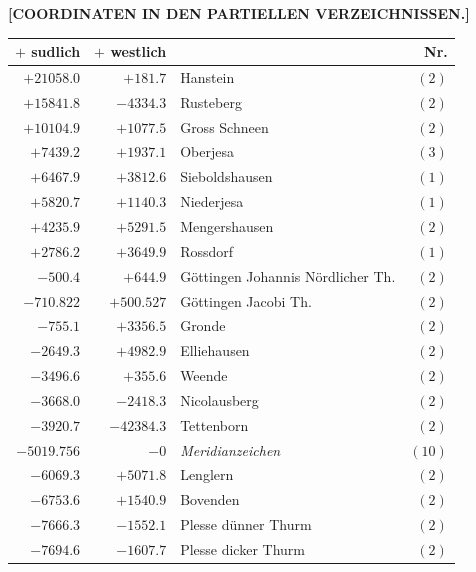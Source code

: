 \clearpage
{}
\begin{center}\textbf{[COORDINATEN IN DEN PARTIELLEN VERZEICHNISSEN.]}\end{center}
\begin{center}\begingroup\fontsize{8}{9}\selectfont
\setlength{\tabcolsep}{4pt}
\begin{tabular}{r|r|p{170pt}|r}\hline
\(+\) sudlich&\(+\) westlich&&Nr.\\\hline
\(+21058.0\)&\(+181.7\)&Hanstein&\((2)\)\\
\(+15841.8\)&\(-4334.3\)&Rusteberg&\((2)\)\\
\(+10104.9\)&\(+1077.5\)&Gross Schneen&\((2)\)\\
\(+7439.2\)&\(+1937.1\)&Oberjesa&\((3)\)\\
\(+6467.9\)&\(+3812.6\)&Sieboldshausen&\((1)\)\\
\(+5820.7\)&\(+1140.3\)&Niederjesa&\((1)\)\\
\(+4235.9\)&\(+5291.5\)&Mengershausen&\((2)\)\\
\(+2786.2\)&\(+3649.9\)&Rossdorf&\((1)\)\\
\(-500.4\)&\(+644.9\)&Göttingen Johannis Nördlicher Th.&\((2)\)\\
\(-710.822\)&\(+500.527\)&Göttingen Jacobi Th.&\((2)\)\\
\(-755.1\)&\(+3356.5\)&Gronde&\((2)\)\\
\(-2649.3\)&\(+4982.9\)&Elliehausen&\((2)\)\\
\(-3496.6\)&\(+355.6\)&Weende&\((2)\)\\
\(-3668.0\)&\(-2418.3\)&Nicolausberg&\((2)\)\\
\(-3920.7\)&\(-42384.3\)&Tettenborn&\((2)\)\\
\(-5019.756\)&\(-0\)&\textit{Meridianzeichen}&\((10)\)\\
\(-6069.3\)&\(+5071.8\)&Lenglern&\((2)\)\\
\(-6753.6\)&\(+1540.9\)&Bovenden&\((2)\)\\
\(-7666.3\)&\(-1552.1\)&Plesse dünner Thurm&\((2)\)\\
\(-7694.6\)&\(-1607.7\)&Plesse dicker Thurm&\((2)\)\\
\hline\end{tabular}\endgroup\end{center}
\clearpage
